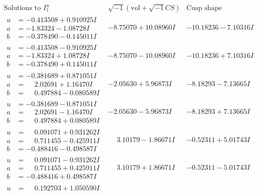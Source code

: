 \documentclass[1p]{elsarticle_modified}
\theoremstyle{definition}
\newcommand{\I}{\sqrt{-1}}
\begin{document}
$$\begin{array}{c|c|c}  
\text{Solutions to }I^u_{1}& \I (\text{vol} + \sqrt{-1}CS) & \text{Cusp shape}\\
 \hline 
\begin{aligned}
u &= -0.413508 + 0.910925 I \\
a &= -1.83324 - 1.08728 I \\
b &= -0.378490 - 0.145011 I\end{aligned}
 & -8.75070 + 10.08960 I & -10.18236 - 7.10316 I \\ \hline\begin{aligned}
u &= -0.413508 - 0.910925 I \\
a &= -1.83324 + 1.08728 I \\
b &= -0.378490 + 0.145011 I\end{aligned}
 & -8.75070 - 10.08960 I & -10.18236 + 7.10316 I \\ \hline\begin{aligned}
u &= -0.381689 + 0.871051 I \\
a &= \phantom{-}2.02691 + 1.16470 I \\
b &= \phantom{-}0.497884 - 0.080589 I\end{aligned}
 & -2.05630 + 5.96873 I & -8.18293 - 7.13665 I \\ \hline\begin{aligned}
u &= -0.381689 - 0.871051 I \\
a &= \phantom{-}2.02691 - 1.16470 I \\
b &= \phantom{-}0.497884 + 0.080589 I\end{aligned}
 & -2.05630 - 5.96873 I & -8.18293 + 7.13665 I \\ \hline\begin{aligned}
u &= \phantom{-}0.091071 + 0.931262 I \\
a &= \phantom{-}0.711455 - 0.425911 I \\
b &= -0.488416 - 0.498587 I\end{aligned}
 & \phantom{-}3.10179 - 1.86671 I & -0.52311 + 5.01743 I \\ \hline\begin{aligned}
u &= \phantom{-}0.091071 - 0.931262 I \\
a &= \phantom{-}0.711455 + 0.425911 I \\
b &= -0.488416 + 0.498587 I\end{aligned}
 & \phantom{-}3.10179 + 1.86671 I & -0.52311 - 5.01743 I \\ \hline\begin{aligned}
u &= \phantom{-}0.192703 + 1.050590 I \\

\end{aligned}
\end{array}$$
\end{document}
